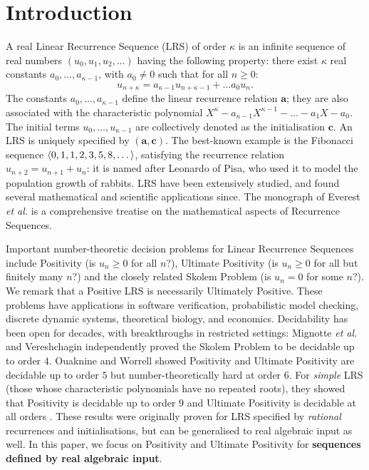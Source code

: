 \section{Introduction}
\label{section:intro}
A real Linear Recurrence Sequence (LRS) of order $\kappa$ is an infinite sequence of real numbers $(u_0, u_1, u_2, \dots)$ having the following property: there exist $\kappa$ real constants $a_{0}, \dots, a_{\kappa-1}$, with $a_0 \ne 0$ such that for all $n \ge 0$:
\begin{equation}
u_{n+\kappa} = a_{\kappa-1}u_{n+\kappa-1} + \dots a_0 u_n.
\end{equation}
The constants $a_0, \dots, a_{\kappa-1}$ define the linear recurrence relation $\mathbf{a}$; they are also associated with the characteristic polynomial
$
X^\kappa - a_{\kappa-1}X^{\kappa-1} - \dots - a_1X - a_0.
$ 
The initial terms $u_0, \dots, u_{\kappa-1}$ are collectively denoted as the initialisation $\mathbf{c}$. An LRS is uniquely specified by $(\mathbf{a}, \mathbf{c})$. The best-known example is the Fibonacci sequence $\langle0, 1, 1, 2, 3, 5, 8, \dots\rangle$, satisfying the recurrence relation $u_{n+2} = u_{n+1} + u_n$: it is named after Leonardo of Pisa, who used it to model the population growth of rabbits. LRS have been extensively studied, and found several mathematical and scientific applications since. The monograph of Everest \textit{et al.} \cite{Everest2003RecurrenceS} is a comprehensive treatise on the mathematical aspects of Recurrence Sequences.

Important number-theoretic decision problems for Linear Recurrence Sequences include Positivity (is $u_n \ge 0$ for all $n$?), Ultimate Positivity (is $u_n \ge 0$ for all but finitely many $n$?) and the closely related Skolem Problem (is $u_n = 0$ for some $n$?). We remark that a Positive LRS is necessarily Ultimately Positive. These problems have applications in software verification, probabilistic model checking, discrete dynamic systems, theoretical biology, and economics. Decidability has been open for decades, with breakthroughs in restricted settings: Mignotte \textit{et al.\ }\cite{mignotte} and Vereshchagin \cite{vereshchagin} independently proved the Skolem Problem to be decidable up to order $4$. Ouaknine and Worrell \cite{joeljames3} showed Positivity and Ultimate Positivity are decidable up to order $5$ but number-theoretically hard at order $6$. For \textit{simple} LRS (those whose characteristic polynomials have no repeated roots), they showed that Positivity is decidable up to order $9$ \cite{ouaknine2014positivity} and Ultimate Positivity is decidable at all orders \cite{ouaknine2014ultimate}. These results were originally proven for LRS specified by \textit{rational} recurrences and initialisations, but can be generalised to real algebraic input as well. In this paper, we focus on Positivity and Ultimate Positivity for \textbf{sequences defined by real algebraic input}.


